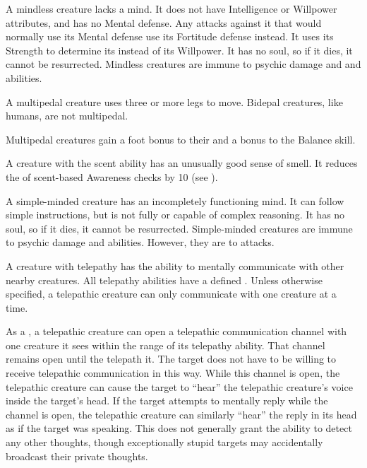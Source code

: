   A mindless creature lacks a mind.
  It does not have Intelligence or Willpower attributes, and has no Mental defense.
  Any attacks against it that would normally use its Mental defense use its Fortitude defense instead.
  It uses its Strength to determine its  instead of its Willpower.
  It has no soul, so if it dies, it cannot be resurrected.
  Mindless creatures are immune to psychic damage and  and  abilities.

  A multipedal creature uses three or more legs to move.
  Bidepal creatures, like humans, are not multipedal.

  Multipedal creatures gain a  foot bonus to their  and a  bonus to the Balance skill.

  A creature with the scent ability has an unusually good sense of smell.
  It reduces the  of scent-based Awareness checks by 10 (see ).

  A simple-minded creature has an incompletely functioning mind.
  It can follow simple instructions, but is not fully  or capable of complex reasoning.
  It has no soul, so if it dies, it cannot be resurrected.
  Simple-minded creatures are immune to psychic damage and  abilities.
  However, they are \vulnerable to  attacks.

  A creature with telepathy has the ability to mentally communicate with other nearby creatures.
  All telepathy abilities have a defined .
  Unless otherwise specified, a telepathic creature can only communicate with one creature at a time.

  As a , a telepathic creature can open a telepathic communication channel with one creature it sees within the range of its telepathy ability.
  That channel remains open until the telepath  it.
  The target does not have to be willing to receive telepathic communication in this way.
  While this channel is open, the telepathic creature can cause the target to ``hear'' the telepathic creature's voice inside the target's head.
  If the target attempts to mentally reply while the channel is open, the telepathic creature can similarly ``hear'' the reply in its head as if the target was speaking.
  This does not generally grant the ability to detect any other thoughts, though exceptionally stupid targets may accidentally broadcast their private thoughts.

